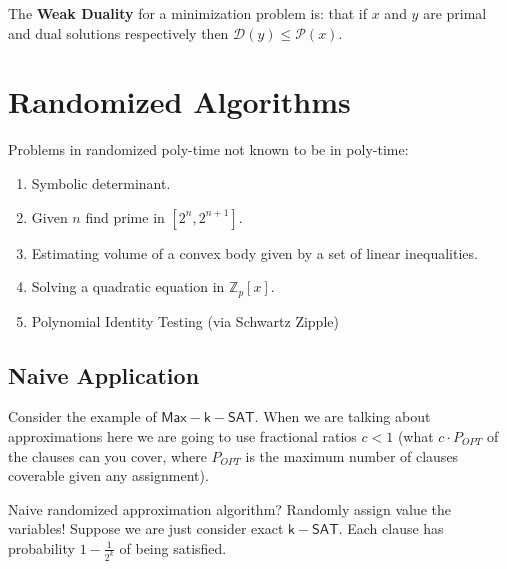 \documentclass[twoside]{article}
\newcommand\Z{\mathbb{Z}}
\begin{document}
The \textbf{Weak Duality} for a minimization problem is: that if $x$ and $y$ are primal and dual solutions respectively then $\mathcal{D}(y) \leq \mathcal{P}(x)$. 

\section{Randomized Algorithms}
Problems in randomized poly-time not known to be in poly-time:
\begin{enumerate}
\item Symbolic determinant.
\item Given $n$ find prime in $[2^n, 2^{n+1}]$.
\item Estimating volume of a convex body given by a set of linear inequalities. 
\item Solving a quadratic equation in $\Z_p[x]$.  
\item Polynomial Identity Testing (via Schwartz Zipple)
\end{enumerate}

\subsection{Naive Application}
Consider the example of $\mathsf{Max-k-SAT}$. When we are talking about approximations here we are going to use fractional ratios $c < 1$ (what $c \cdot P_{OPT}$ of the clauses can you cover, where $P_{OPT}$ is the maximum number of clauses coverable given any assignment).

Naive randomized approximation algorithm? Randomly assign value the variables! Suppose we are just consider exact $\mathsf{k-SAT}$. Each clause has probability $1 - \frac{1}{2^k}$ of being satisfied.   
\end{document}
